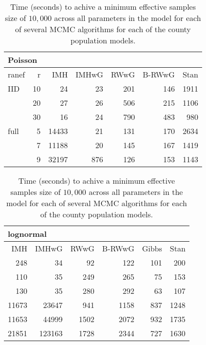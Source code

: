 \documentclass[12pt]{article}
\begin{document}
\begin{table}[ht]
\centering
\tiny{
\begin{tabular}{lr|rrrrr}
\multicolumn{7}{l}{Poisson}\\
  \hline
ranef & r & IMH & IMHwG & RWwG & B-RWwG & Stan \\ 
  \hline
IID &10 & 24 & 23 & 201 & 146 & 1911 \\ 
    &20 & 27 & 26 & 506 & 215 & 1106 \\ 
    &30 & 16 & 24 & 790 & 483 & 980 \\ \hline
full&5 & 14433 & 21 & 131 & 170 & 2634 \\ 
    &7 & 11188 & 20 & 145 & 167 & 1419 \\ 
    &9 & 32197 & 876 & 126 & 153 & 1143 \\ 
   \hline
\end{tabular}
\begin{tabular}{rrrrrr}
\multicolumn{6}{l}{lognormal}\\
  \hline
 IMH & IMHwG & RWwG & B-RWwG & Gibbs & Stan \\ 
  \hline
 248 & 34 & 92 & 122 & 101 & 200 \\ 
 110 & 35 & 249 & 265 & 75 & 153 \\ 
 130 & 35 & 280 & 292 & 63 & 107 \\ \hline
 11673 & 23647 & 941 & 1158 & 837 & 1248 \\ 
 11653 & 44999 & 1502 & 2072 & 932 & 1735 \\ 
 21851 & 123163 & 1728 & 2344 & 727 & 1630 \\ 
   \hline
\end{tabular}
}
\label{tab:mcmcpopnefftime}
\caption{Time (seconds) to achive a minimum effective samples size of $10,000$ across all parameters in the model for each of several MCMC algorithms for each of the county population models.}
\end{table}




\end{document}
